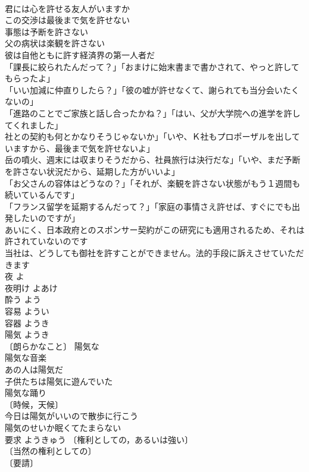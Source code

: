 \documentclass[8pt]{extreport}
\begin{document}
\begin{CJK}{UTF8}{min}
\\	君には心を許せる友人がいますか 
\\	この交渉は最後まで気を許せない 
\\	事態は予断を許さない 
\\	父の病状は楽観を許さない 
\\	彼は自他ともに許す経済界の第一人者だ 
\\	「課長に絞られたんだって？」「おまけに始末書まで書かされて、やっと許してもらったよ」 
\\	「いい加減に仲直りしたら？」「彼の嘘が許せなくて、謝られても当分会いたくないの」 
\\	「進路のことでご家族と話し合ったかね？」「はい、父が大学院への進学を許してくれました」 
\\	社との契約も何とかなりそうじゃないか」「いや、Ｋ社もプロポーザルを出していますから、最後まで気を許せないよ」 
\\	岳の噴火、週末には収まりそうだから、社員旅行は決行だな」「いや、まだ予断を許さない状況だから、延期した方がいいよ」 
\\	「お父さんの容体はどうなの？」「それが、楽観を許さない状態がもう１週間も続いているんです」 
\\	「フランス留学を延期するんだって？」「家庭の事情さえ許せば、すぐにでも出発したいのですが」 
\\	あいにく、日本政府とのスポンサー契約がこの研究にも適用されるため、それは許されていないのです 
\\	当社は、どうしても御社を許すことができません。法的手段に訴えさせていただきます 
\\	夜	よ	
\\	夜明け	よあけ	
\\	酔う	よう	
\\	容易	ようい	
\\	容器	ようき	
\\	陽気	ようき	
\\	〔朗らかなこと〕 陽気な 
\\	陽気な音楽 
\\	あの人は陽気だ 
\\	子供たちは陽気に遊んでいた 
\\	陽気な踊り 
\\	〔時候，天候〕
\\	今日は陽気がいいので散歩に行こう 
\\	陽気のせいか眠くてたまらない 
\\	要求	ようきゅう	〔権利としての，あるいは強い〕
\\	〔当然の権利としての〕
\\	〔要請〕

\end{CJK}
\end{document}
